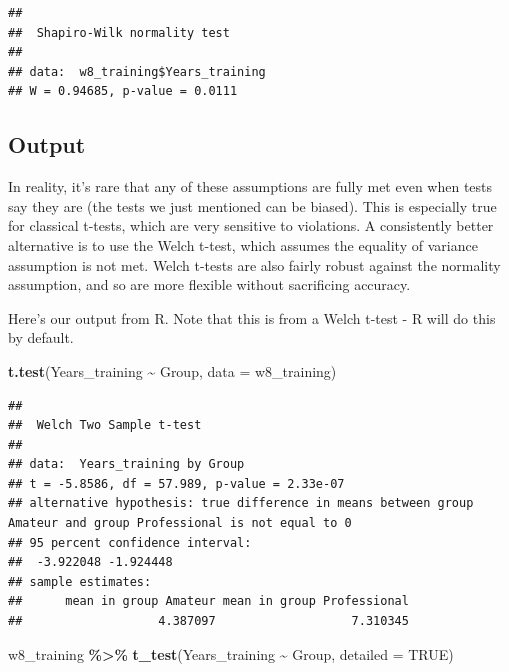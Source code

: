 \documentclass[
]{book}
\newenvironment{Shaded}{\begin{snugshade}}{\end{snugshade}}
\newcommand{\AttributeTok}[1]{\textcolor[rgb]{0.13,0.29,0.53}{#1}}
\newcommand{\ConstantTok}[1]{\textcolor[rgb]{0.56,0.35,0.01}{#1}}
\newcommand{\FunctionTok}[1]{\textcolor[rgb]{0.13,0.29,0.53}{\textbf{#1}}}
\newcommand{\NormalTok}[1]{#1}
\newcommand{\SpecialCharTok}[1]{\textcolor[rgb]{0.81,0.36,0.00}{\textbf{#1}}}
\begin{document}
\begin{Shaded}
\end{Shaded}

\begin{verbatim}
## 
##  Shapiro-Wilk normality test
## 
## data:  w8_training$Years_training
## W = 0.94685, p-value = 0.0111
\end{verbatim}

\hypertarget{output-3}{%
\subsection{Output}\label{output-3}}

In reality, it's rare that any of these assumptions are fully met even when tests say they are (the tests we just mentioned can be biased). This is especially true for classical t-tests, which are very sensitive to violations. A consistently better alternative is to use the Welch t-test, which assumes the equality of variance assumption is not met. Welch t-tests are also fairly robust against the normality assumption, and so are more flexible without sacrificing accuracy.

Here's our output from R. Note that this is from a Welch t-test - R will do this by default.

\begin{Shaded}
\begin{Highlighting}[]
\FunctionTok{t.test}\NormalTok{(Years\_training }\SpecialCharTok{\textasciitilde{}}\NormalTok{ Group, }\AttributeTok{data =}\NormalTok{ w8\_training)}
\end{Highlighting}
\end{Shaded}

\begin{verbatim}
## 
##  Welch Two Sample t-test
## 
## data:  Years_training by Group
## t = -5.8586, df = 57.989, p-value = 2.33e-07
## alternative hypothesis: true difference in means between group Amateur and group Professional is not equal to 0
## 95 percent confidence interval:
##  -3.922048 -1.924448
## sample estimates:
##      mean in group Amateur mean in group Professional 
##                   4.387097                   7.310345
\end{verbatim}

\begin{Shaded}
\begin{Highlighting}[]
\NormalTok{w8\_training }\SpecialCharTok{\%\textgreater{}\%}
  \FunctionTok{t\_test}\NormalTok{(Years\_training }\SpecialCharTok{\textasciitilde{}}\NormalTok{ Group, }\AttributeTok{detailed =} \ConstantTok{TRUE}\NormalTok{)}
\end{Highlighting}
\end{Shaded}
\end{document}
